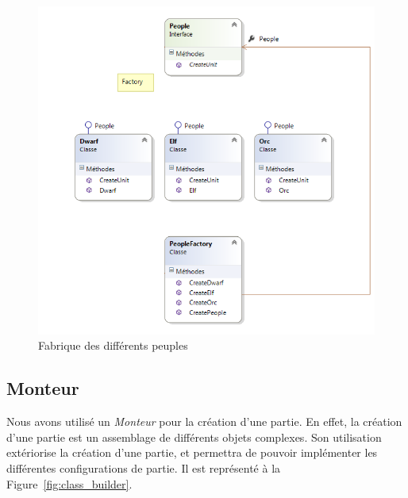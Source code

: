 \documentclass[a4paper]{article}
\begin{document}
\begin{figure}[ht]
\centering
	\includegraphics[width=\textwidth]{../Schemas/class_People_Factory.png}
		\caption{Fabrique des différents peuples}
		\label{fig:class_factory}
\end{figure}

\clearpage
	\subsection{Monteur}
Nous avons utilisé un \textit{Monteur} pour la création d'une partie. En effet, la création d'une partie est un assemblage de différents objets complexes. Son utilisation extériorise la création d'une partie, et permettra de pouvoir implémenter les différentes configurations de partie. Il est représenté à la Figure~\ref{fig:class_builder}.
\end{document}
